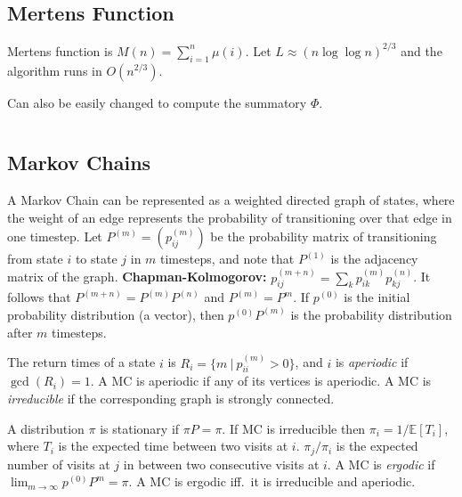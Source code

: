 \documentclass[9pt,a4paper,twocolumn,landscape,oneside]{amsart}
\newcommand{\code}[1]{\inputminted{cpp}{_code/#1}}
\newif\ifverbose
\begin{document}
    \subsection{Mertens Function}
        Mertens function is $M(n) = \sum_{i=1}^n \mu(i)$. Let $L\approx
        (n\log{\log{n}})^{2/3}$ and the algorithm runs in $O(n^{2/3})$.
        \ifverbose
        \else
            Can also be easily changed to compute the summatory $\Phi$.
        \fi
        \code{mathematics/mertens.cpp}
    \ifverbose
    \subsection{Summatory Phi}
        The summatory phi function $\Phi(n) = \sum_{i=1}^n \phi(i)$. Let $L\approx
        (n\log{\log{n}})^{2/3}$ and the algorithm runs in $O(n^{2/3})$.
        \code{mathematics/summatory_phi.cpp}
    \fi

    \subsection{Markov Chains}
        A Markov Chain can be represented as a weighted directed graph of
        states, where the weight of an edge represents the probability of
        transitioning over that edge in one timestep. Let $P^{(m)} = (p^{(m)}_{ij})$
        be the probability matrix of transitioning from state $i$ to state $j$
        in $m$ timesteps, and note that $P^{(1)}$ is the adjacency matrix of
        the graph. \textbf{Chapman-Kolmogorov:} $p^{(m+n)}_{ij} = \sum_{k}
        p^{(m)}_{ik} p^{(n)}_{kj}$. It follows that $P^{(m+n)} =
        P^{(m)}P^{(n)}$ and $P^{(m)} = P^m$. If $p^{(0)}$ is the initial
        probability distribution (a vector), then $p^{(0)}P^{(m)}$ is the
        probability distribution after $m$ timesteps. 

        The return times of a state $i$ is $R_i = \{m\ |\ p^{(m)}_{ii} > 0 \}$,
        and $i$ is \textit{aperiodic} if $\gcd(R_i) = 1$. A MC is aperiodic if
        any of its vertices is aperiodic. A MC is \textit{irreducible} if the
        corresponding graph is strongly connected.

        A distribution $\pi$ is stationary if $\pi P = \pi$. If MC is
        irreducible then $\pi_i = 1/\mathbb{E}[T_i]$, where $T_i$ is the
        expected time between two visits at $i$. $\pi_j/\pi_i$ is the expected
        number of visits at $j$ in between two consecutive visits at $i$. A MC
        is \textit{ergodic} if $\lim_{m\to\infty} p^{(0)} P^{m} = \pi$. A MC is
        ergodic iff.\ it is irreducible and aperiodic.
\end{document}
